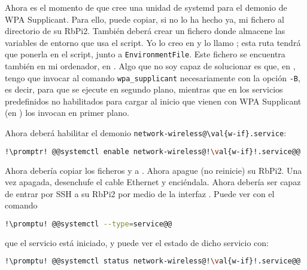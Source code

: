 Ahora es el momento de que cree una unidad de systemd para el demonio de WPA Supplicant. Para ello, puede
copiar, si no lo ha hecho ya, mi fichero  al
directorio  de su RbPi2. También deberá crear un fichero donde almacene las variables
de entorno que usa el script. Yo lo creo en   y lo llamo ; esta
ruta tendrá que ponerla en el script, junto a \lstinline!EnvironmentFile!. Este fichero se encuentra también en
mi ordenador, en . Algo que no soy capaz de solucionar es que, en
, tengo que invocar al comando \lstinline+wpa_supplicant+ necesariamente con
la opción \lstinline+-B+, es decir, para que se ejecute en segundo plano, mientras que en los servicios
predefinidos no habilitados para cargar al inicio que vienen con WPA Supplicant (en
) los invocan en primer plano.

Ahora deberá habilitar el demonio \lstinline!network-wireless@\val{w-if}.service!:

\begin{lstlisting}[gobble=2,language=bash,style=bashinteract,escapechar=!]
  !\promptr! @@systemctl enable network-wireless@!\val{w-if}!.service@@
\end{lstlisting}

Ahora debería copiar los ficheros  y
 a . Ahora apague (no reinicie)
su RbPi2. Una vez apagada, desenchufe el cable Ethernet y enciéndala. Ahora debería ser capaz de entrar por SSH
a su RbPi2 por medio de la interfaz . Puede ver con el comando

\begin{lstlisting}[gobble=2,language=bash,style=bashinteract,escapechar=!]
  !\promptu! @@systemctl --type=service@@
\end{lstlisting}

\noindent que el servicio  está iniciado, y puede ver el estado de dicho
servicio con:

\begin{lstlisting}[gobble=2,language=bash,style=bashinteract,escapechar=!]
  !\promptu! @@systemctl status network-wireless@!\val{w-if}!.service@@
\end{lstlisting}


